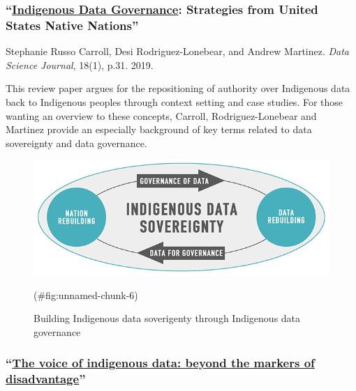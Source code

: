 \documentclass[
]{book}
\begin{document}
\hypertarget{indigenous-data-governance-strategies-from-united-states-native-nations}{%
\subsubsection*{\texorpdfstring{``\href{https://datascience.codata.org/articles/10.5334/dsj-2019-031/}{Indigenous Data Governance}: Strategies from United States Native Nations''}{``Indigenous Data Governance: Strategies from United States Native Nations''}}\label{indigenous-data-governance-strategies-from-united-states-native-nations}}

Stephanie Russo Carroll, Desi Rodriguez-Lonebear, and Andrew Martinez. \emph{Data Science Journal}, 18(1), p.31. 2019.

This review paper argues for the repositioning of authority over Indigenous data back to Indigenous peoples through context setting and case studies. For those wanting an overview to these concepts, Carroll, Rodriguez-Lonebear and Martinez provide an especially background of key terms related to data sovereignty and data governance.

\begin{figure}
\includegraphics[width=8.89in]{images/download} \caption{Building Indigenous data soverigenty through Indigenous data governance}(\#fig:unnamed-chunk-6)
\end{figure}

\hypertarget{the-voice-of-indigenous-data-beyond-the-markers-of-disadvantage}{%
\subsubsection*{\texorpdfstring{``\href{https://www.griffithreview.com/articles/voice-indigenous-data-beyond-disadvantage/}{The voice of indigenous data: beyond the markers of disadvantage}''}{``The voice of indigenous data: beyond the markers of disadvantage''}}\label{the-voice-of-indigenous-data-beyond-the-markers-of-disadvantage}}
\end{document}
